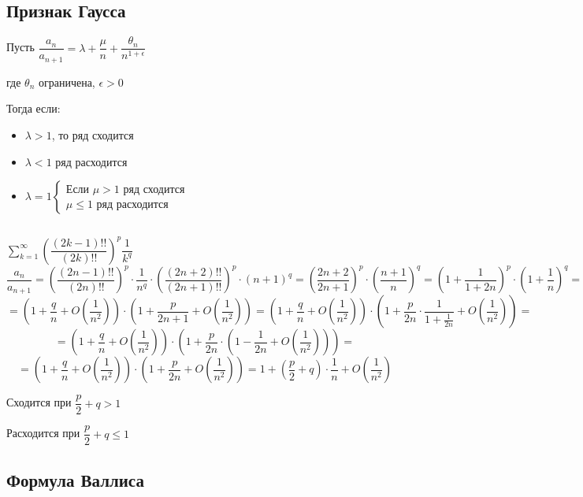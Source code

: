 \documentclass[../../main.tex]{subfiles}
\begin{document}
\subsection{Признак Гаусса}

Пусть $\dfrac{a_n}{a_{n+1}} = \lambda + \dfrac{\mu}{n} +
\dfrac{\theta_n}{n^{1 + \epsilon}}$

где $\theta_n $ ограничена, $\epsilon > 0$

Тогда если:
\begin{itemize}
	 \item[] $\lambda > 1$, то ряд сходится
	 \item[] $\lambda < 1$ ряд расходится
	 \item[] $\lambda = 1
	 \begin{cases}
	 	\text{Если } \mu > 1 \text{ ряд сходится}\\
	 	\mu \leq 1 \text{ ряд расходится} 
	 \end{cases}$
\end{itemize}

\begin{example}
$ $

$\sum\limits_{k = 1}^{\infty}\left(\dfrac{(2k - 1)!!}{(2k)!!} \right)^p
\dfrac{1}{k^q}$
\[
\dfrac{a_{n}}{a_{n + 1}} = \left(\dfrac{(2n - 1)!!}{(2n)!!}\right)^p \cdot
\dfrac{1}{n^q} \cdot\left( \dfrac{(2n + 2)!!}{(2n + 1)!!}\right)^p \cdot
(n + 1)^q = \left(\dfrac{2n + 2}{2n + 1}\right)^p \cdot
\left(\dfrac{n+1}{n}\right)^q = \left(1 + \dfrac{1}{1 + 2n}\right)^p \cdot
\left(1 + \dfrac{1}{n}\right)^q =
\]
\[
= \left(1 + \dfrac{q}{n} + O\left(\dfrac{1}{n^2}\right)\right) \cdot
\left(1 + \dfrac{p}{2n + 1} + O\left(\dfrac{1}{n^2}\right)\right) =
\left(1 + \dfrac{q}{n} + O\left(\dfrac{1}{n^2}\right)\right) \cdot
\left(1 + \dfrac{p}{2n} \cdot \dfrac{1}{1 + \frac{1}{2n}}
+ O\left(\dfrac{1}{n^2}\right)\right) =
\]
\[
= \left(1 + \dfrac{q}{n} + O\left(\dfrac{1}{n^2}\right)\right) \cdot \left(1 +
\dfrac{p}{2n} \cdot \left(1 - \dfrac{1}{2n} + O\left(\dfrac{1}{n^2}
\right)\right)\right) =
\]
\[
= \left(1 + \dfrac{q}{n} + O\left(\dfrac{1}{n^2}\right)\right) \cdot \left(1 +
\dfrac{p}{2n} + O\left(\dfrac{1}{n^2}\right)\right) = 1 + \left(\dfrac{p}{2} +
q \right) \cdot \dfrac{1}{n} + O\left(\dfrac{1}{n^2}\right)
\]

Сходится при $\dfrac{p}{2} + q > 1$

Расходится при $\dfrac{p}{2} + q \leq 1$ 
\end{example}

\subsection{Формула Валлиса}
\end{document}
